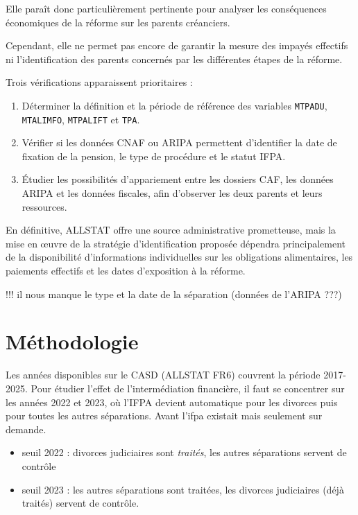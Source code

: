 \documentclass[11pt,a4paper]{article}
\begin{document}
Elle paraît donc
particulièrement pertinente
pour analyser
les conséquences
économiques de la réforme
sur les parents créanciers.

Cependant, elle ne
permet pas encore
de garantir la mesure
des impayés effectifs
ni l'identification
des parents concernés
par les différentes
étapes de la réforme.

Trois vérifications
apparaissent prioritaires :

\begin{enumerate}
    \item Déterminer la définition
    et la période de référence
    des variables
    \texttt{MTPADU},
    \texttt{MTALIMFO},
    \texttt{MTPALIFT}
    et \texttt{TPA}.

    \item Vérifier si les
    données CNAF ou ARIPA
    permettent d'identifier
    la date de fixation
    de la pension,
    le type de procédure
    et le statut IFPA.

    \item Étudier les possibilités
    d'appariement entre
    les dossiers CAF,
    les données ARIPA
    et les données fiscales,
    afin d'observer
    les deux parents
    et leurs ressources.
\end{enumerate}

En définitive, ALLSTAT
offre une source
administrative prometteuse,
mais la mise en œuvre
de la stratégie
d'identification proposée
dépendra principalement
de la disponibilité
d'informations individuelles
sur les obligations
alimentaires,
les paiements effectifs
et les dates d'exposition
à la réforme.


!!! il nous manque le type et la date de la séparation (données de l'ARIPA ???)


\section{Méthodologie}

Les années disponibles sur le CASD (ALLSTAT FR6) couvrent la période 2017-2025. 
Pour étudier l'effet de l'intermédiation financière, 
il faut se concentrer sur les années 2022 et 2023, 
où l'IFPA devient automatique pour les divorces puis pour toutes les autres séparations.
Avant l'ifpa existait mais seulement sur demande.
\begin{itemize}
    \item  seuil 2022 : divorces judiciaires sont \textit{traités},
les autres séparations servent de contrôle
\item seuil 2023 : les autres séparations sont traitées, les divorces judiciaires (déjà traités)
 servent de contrôle.

\end{itemize}
\end{document}
